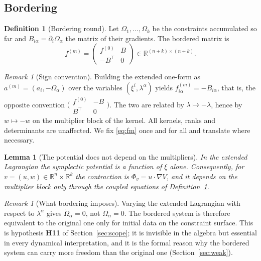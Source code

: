 \documentclass[12pt]{article}
\theoremstyle{plain}
\newtheorem{lemma}[theorem]{Lemma}
\theoremstyle{definition}
\newtheorem{definition}[theorem]{Definition}
\theoremstyle{remark}
\newtheorem{remark}[theorem]{Remark}
\newcommand{\R}{\mathbb{R}}
\newcommand{\pd}[1]{\partial_{#1}}
\newcommand{\Om}{\Omega}
\begin{document}
	\subsection{Bordering}
	
	\begin{definition}[Bordering round]
		\label{def:bordering}
		Let $\Om_{1},\dots,\Om_{k}$ be the constraints accumulated so far and
		$B_{i\alpha}=\pd{i}\Om_{\alpha}$ the matrix of their gradients. The bordered
		matrix is
		\begin{equation}
			f^{(m)}=\begin{pmatrix}f^{(0)}&B\\-B^{\top}&0\end{pmatrix}
			\in\R^{(n+k)\times(n+k)} .
			\label{eq:fm}
		\end{equation}
	\end{definition}
	
	\begin{remark}[Sign convention]
		\label{rem:sign}
		Building the extended one-form as
		$a^{(m)}=(a_{i},-\Om_{\alpha})$ over the variables $(\xi^{i},\lambda^{\alpha})$
		yields $f^{(m)}_{i\alpha}=-B_{i\alpha}$, that is, the opposite convention
		$\bigl(\begin{smallmatrix}f^{(0)}&-B\\ B^{\top}&0\end{smallmatrix}\bigr)$. The
		two are related by $\lambda\mapsto-\lambda$, hence by $w\mapsto-w$ on the
		multiplier block of the kernel. All kernels, ranks and determinants are
		unaffected. We fix \eqref{eq:fm} once and for all and translate where necessary.
	\end{remark}
	
	\begin{lemma}[The potential does not depend on the multipliers]
		\label{lem:Vlambda}
		In the extended Lagrangian the symplectic potential is a function of $\xi$
		alone. Consequently, for $v=(u,w)\in\R^{n}\times\R^{k}$ the contraction is
		$\Phi_{v}=u\cdot\nabla V$, and it depends on the multiplier block only through
		the coupled equations of Definition~\ref{def:bordering}.
	\end{lemma}
	
	\begin{remark}[What bordering imposes]
		\label{rem:borderimposes}
		Varying the extended Lagrangian with respect to $\lambda^{\alpha}$ gives
		$\dot\Om_{\alpha}=0$, not $\Om_{\alpha}=0$. The bordered system is therefore
		equivalent to the original one only for initial data on the constraint surface.
		This is hypothesis \textbf{H11} of Section~\ref{sec:scope}; it is invisible in
		the algebra but essential in every dynamical interpretation, and it is the
		formal reason why the bordered system can carry more freedom than the original
		one (Section~\ref{sec:weak}).
	\end{remark}
	
\end{document}
